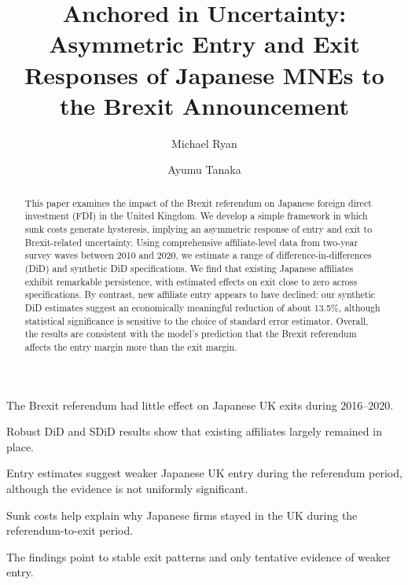 \documentclass[preprint,11pt,authoryear]{elsarticle}
\begin{document}
\begin{frontmatter}

\title{Anchored in Uncertainty: Asymmetric Entry and Exit Responses of Japanese MNEs to the Brexit Announcement}

\author[inst1]{Michael Ryan}

\author[inst2]{Ayumu Tanaka}




\begin{abstract}
This paper examines the impact of the Brexit referendum on Japanese foreign direct investment (FDI) in the United Kingdom. We develop a simple framework in which sunk costs generate hysteresis, implying an asymmetric response of entry and exit to Brexit-related uncertainty. Using comprehensive affiliate-level data from two-year survey waves between 2010 and 2020, we estimate a range of difference-in-differences (DiD) and synthetic DiD specifications.
We find that existing Japanese affiliates exhibit remarkable persistence, with estimated effects on exit close to zero across specifications. By contrast, new affiliate entry appears to have declined: our synthetic DiD estimates suggest an economically meaningful reduction of about 13.5\%, although statistical significance is sensitive to the choice of standard error estimator.
Overall, the results are consistent with the model’s prediction that the Brexit referendum affects the entry margin more than the exit margin.
\end{abstract}


\begin{highlights}
\item The Brexit referendum had little effect on Japanese UK exits during 2016--2020.
\item Robust DiD and SDiD results show that existing affiliates largely remained in place.
\item Entry estimates suggest weaker Japanese UK entry during the referendum period, although the evidence is not uniformly significant.
\item Sunk costs help explain why Japanese firms stayed in the UK during the referendum-to-exit period.
\item The findings point to stable exit patterns and only tentative evidence of weaker entry.
\end{highlights}




\end{frontmatter}
\end{document}
